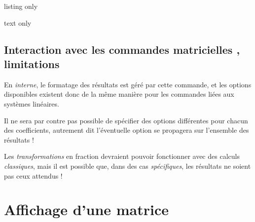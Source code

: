 \documentclass[a4paper,11pt]{article}
\begin{document}
\begin{PresentationCode}{listing only}





\end{PresentationCode}

\begin{PresentationCode}{text only}
\hfill{} \qquad
{} \qquad
{} \qquad
{} \qquad
{} \qquad
{}\hfill~
\end{PresentationCode}

\subsection{Interaction avec les commandes \og matricielles \fg, limitations}

\begin{warningblock}
En \textit{interne}, le formatage des résultats est géré par cette commande, et les options disponibles existent donc de la même manière pour les commandes liées aux systèmes linéaires.

\smallskip

Il ne sera par contre pas possible de spécifier des options différentes pour chacun des coefficients, autrement dit l'éventuelle option se propagera sur l'ensemble des résultats !

\smallskip

Les \textit{transformations} en fraction devraient pouvoir fonctionner avec des calculs \textit{classiques}, mais il est possible que, dans des cas \textit{spécifiques}, les résultats ne soient pas ceux attendus !
\end{warningblock}

\pagebreak

\section{Affichage d'une matrice}
\end{document}
